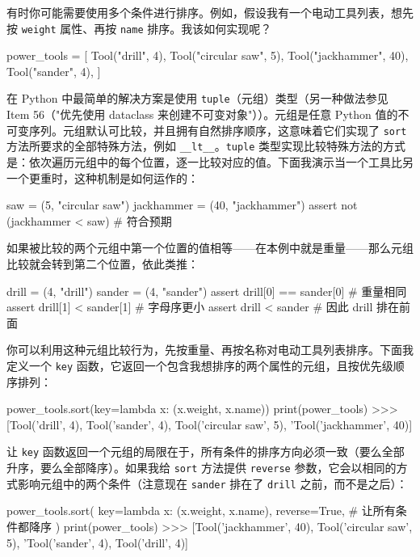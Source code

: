 有时你可能需要使用多个条件进行排序。例如，假设我有一个电动工具列表，想先按 \texttt{weight} 属性、再按 \texttt{name} 排序。我该如何实现呢？

\begin{codebox}[python]
power_tools = [
    Tool("drill", 4),
    Tool("circular saw", 5),
    Tool("jackhammer", 40),
    Tool("sander", 4),
]
\end{codebox}

在 Python 中最简单的解决方案是使用 \texttt{tuple}（元组）类型（另一种做法参见 Item 56（"优先使用 dataclass 来创建不可变对象"））。元组是任意 Python 值的不可变序列。元组默认可比较，并且拥有自然排序顺序，这意味着它们实现了 \texttt{sort} 方法所要求的全部特殊方法，例如 \texttt{\_\_lt\_\_}。\texttt{tuple} 类型实现比较特殊方法的方式是：依次遍历元组中的每个位置，逐一比较对应的值。下面我演示当一个工具比另一个更重时，这种机制是如何运作的：

\begin{codebox}[python]
saw = (5, "circular saw")
jackhammer = (40, "jackhammer")
assert not (jackhammer < saw)  # 符合预期
\end{codebox}

如果被比较的两个元组中第一个位置的值相等——在本例中就是重量——那么元组比较就会转到第二个位置，依此类推：

\begin{codebox}[python]
drill = (4, "drill")
sander = (4, "sander")
assert drill[0] == sander[0]  # 重量相同
assert drill[1] < sander[1]   # 字母序更小
assert drill < sander         # 因此 drill 排在前面
\end{codebox}

你可以利用这种元组比较行为，先按重量、再按名称对电动工具列表排序。下面我定义一个 \texttt{key} 函数，它返回一个包含我想排序的两个属性的元组，且按优先级顺序排列：

\begin{codebox}[python]
power_tools.sort(key=lambda x: (x.weight, x.name))
print(power_tools)
>>>
[Tool('drill', 4), Tool('sander', 4), Tool('circular saw', 5),
'Tool('jackhammer', 40)]
\end{codebox}

让 \texttt{key} 函数返回一个元组的局限在于，所有条件的排序方向必须一致（要么全部升序，要么全部降序）。如果我给 \texttt{sort} 方法提供 \texttt{reverse} 参数，它会以相同的方式影响元组中的两个条件（注意现在 \texttt{sander} 排在了 \texttt{drill} 之前，而不是之后）：

\begin{codebox}[python]
power_tools.sort(
    key=lambda x: (x.weight, x.name),
    reverse=True,  # 让所有条件都降序
)
print(power_tools)
>>>
[Tool('jackhammer', 40), Tool('circular saw', 5),
'Tool('sander', 4), Tool('drill', 4)]
\end{codebox}

